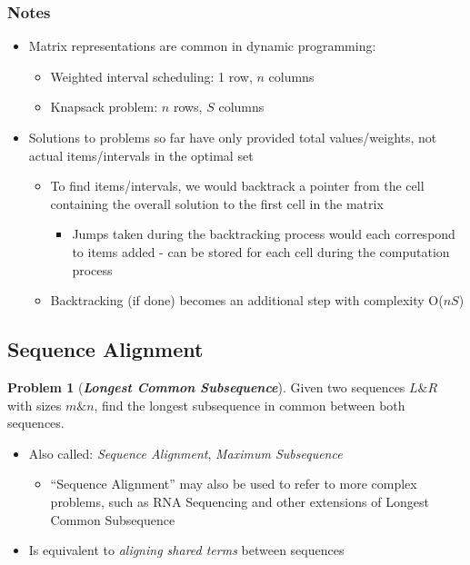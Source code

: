 \documentclass[12pt]{extarticle}
\theoremstyle{definition}
\newtheorem*{problem}{Problem}
\theoremstyle{remark}
\newcommand{\probname}[1]{\noindent \textbf{\textit{#1}}}
\begin{document}
\subsubsection*{Notes}
\begin{itemize}
    \item Matrix representations are common in dynamic programming: \begin{itemize}
        \item Weighted interval scheduling: 1 row, $n$ columns
        \item Knapsack problem: $n$ rows, $S$ columns
    \end{itemize}
    \item Solutions to problems so far have only provided total values/weights, not actual items/intervals in the optimal set \begin{itemize}
        \item To find items/intervals, we would backtrack a pointer from the cell containing the overall solution to the first cell in the matrix \begin{itemize}
            \item Jumps taken during the backtracking process would each correspond to items added - can be stored for each cell during the computation process
        \end{itemize}
        \item Backtracking (if done) becomes an additional step with complexity O($nS$)
    \end{itemize}
\end{itemize}

\pagebreak
\subsection{Sequence Alignment}
\begin{problem}[\probname{Longest Common Subsequence}]
    Given two sequences $L \& R$ with sizes $m \& n$, find the longest subsequence in common between both sequences. \begin{itemize}
        \item Also called: \textit{Sequence Alignment}, \textit{Maximum Subsequence} \begin{itemize}
            \item ``Sequence Alignment'' may also be used to refer to more complex problems, such as RNA Sequencing and other extensions of Longest Common Subsequence
        \end{itemize}
        \item Is equivalent to \textit{aligning shared terms} between sequences
    \end{itemize}
\end{problem}
\end{document}
